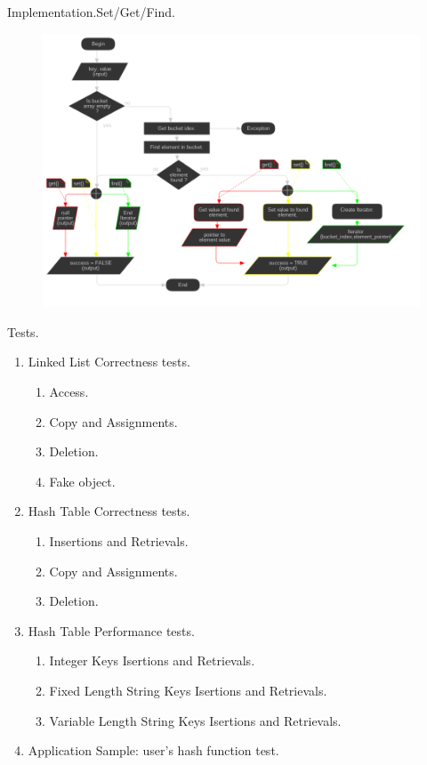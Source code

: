 \documentclass{beamer}
\begin{document}
\begin{frame}{Implementation.}{Set/Get/Find.}
  \begin{figure}
    \includegraphics[scale=0.3]{pictures/implementation_set_get_find_flowchart}
  \end{figure}
\end{frame}

\begin{frame}{Tests.}
  \begin{enumerate}
  \item Linked List Correctness tests.
    \begin{enumerate}
    \item Access.
    \item Copy and Assignments.
    \item Deletion.
    \item Fake object.
    \end{enumerate}

  \item Hash Table Correctness tests.
    \begin{enumerate}
    \item Insertions and Retrievals.
    \item Copy and Assignments.
    \item Deletion.
    \end{enumerate}
  \item Hash Table Performance tests.
    \begin{enumerate}
    \item Integer Keys Isertions and Retrievals.
    \item Fixed Length String Keys Isertions and Retrievals.
    \item Variable Length String Keys Isertions and Retrievals.
    \end{enumerate}
  \item Application Sample: user's hash function test.
  \end{enumerate}
\end{frame}
\end{document}
